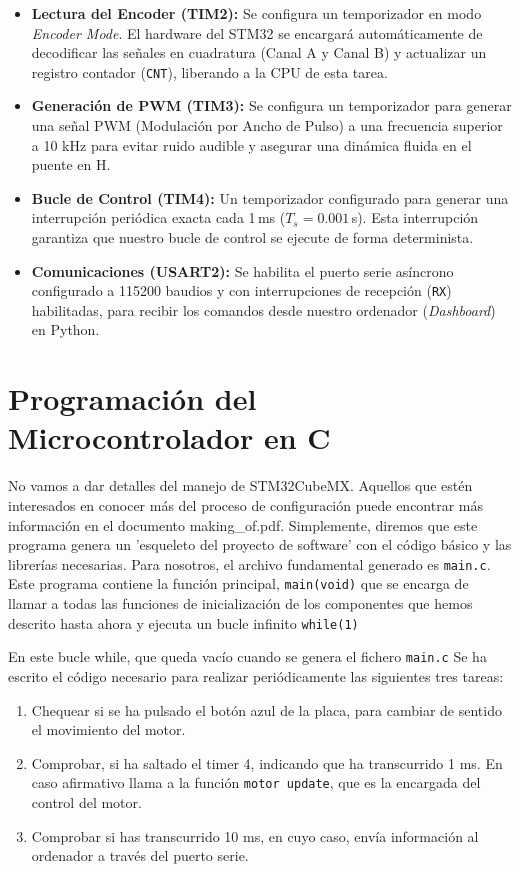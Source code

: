 \documentclass[10pt,a4paper]{report}
\begin{document}
\begin{itemize}
	\item \textbf{Lectura del Encoder (TIM2):} Se configura un temporizador en modo \textit{Encoder Mode}. El hardware del STM32 se encargará automáticamente de decodificar las señales en cuadratura (Canal A y Canal B) y actualizar un registro contador (\texttt{CNT}), liberando a la CPU de esta tarea.
	\item \textbf{Generación de PWM (TIM3):} Se configura un temporizador para generar una señal PWM (Modulación por Ancho de Pulso) a una frecuencia superior a 10 kHz para evitar ruido audible y asegurar una dinámica fluida en el puente en H.
	\item \textbf{Bucle de Control (TIM4):} Un temporizador configurado para generar una interrupción periódica exacta cada 1\,ms ($T_s = 0.001\,$s). Esta interrupción garantiza que nuestro bucle de control se ejecute de forma determinista.
	\item \textbf{Comunicaciones (USART2):} Se habilita el puerto serie asíncrono configurado a 115200 baudios y con interrupciones de recepción (\texttt{RX}) habilitadas, para recibir los comandos desde nuestro ordenador (\textit{Dashboard}) en Python. 
\end{itemize}

\section{Programación del Microcontrolador en C}
No vamos a dar detalles del manejo de STM32CubeMX. Aquellos que estén interesados en conocer más del proceso de configuración puede encontrar más información en el documento making\_of.pdf. Simplemente, diremos que este programa genera un 'esqueleto del proyecto de software' con el código básico y las librerías necesarias. Para nosotros, el archivo fundamental generado es \texttt{main.c}. Este programa contiene la función principal, \texttt{main(void)} que se encarga de llamar a todas las funciones de inicialización de los componentes que hemos descrito hasta ahora y ejecuta un bucle infinito \texttt{while(1)} 


En este bucle while, que queda vacío cuando se genera el fichero \texttt{main.c} Se ha escrito el código necesario para realizar periódicamente las siguientes tres tareas:
\begin{enumerate}
	\item Chequear si se ha pulsado el botón azul de la placa, para cambiar de sentido el movimiento del motor.
	\item Comprobar, si ha saltado el timer 4, indicando que ha transcurrido 1 ms. En caso afirmativo llama a la función \texttt{motor update}, que es la encargada del control del motor.
	\item Comprobar si has transcurrido 10 ms, en cuyo caso, envía información al ordenador a través del puerto serie.
\end{enumerate}
\end{document}
